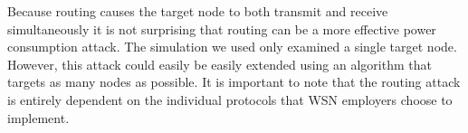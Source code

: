 Because routing causes the target node to both transmit and receive simultaneously it is not surprising that routing can be a more effective power consumption attack. The simulation we used only examined a single target node. However, this attack could easily be easily extended using an algorithm that targets as many nodes as possible. It is important to note that the routing attack is entirely dependent on the individual protocols that WSN employers choose to implement. 
